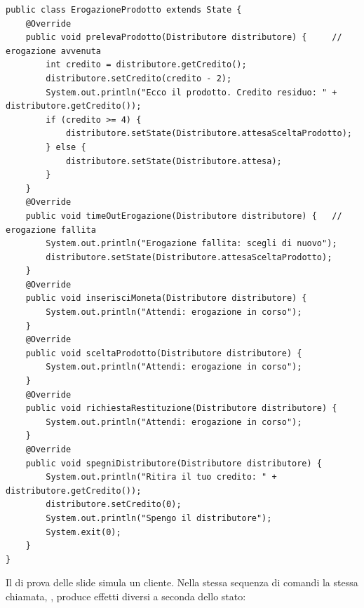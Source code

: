 \begin{lstlisting}[style=java, name=ErogazioneProdotto.java]
public class ErogazioneProdotto extends State {
    @Override
    public void prelevaProdotto(Distributore distributore) {     // erogazione avvenuta
        int credito = distributore.getCredito();
        distributore.setCredito(credito - 2);
        System.out.println("Ecco il prodotto. Credito residuo: " + distributore.getCredito());
        if (credito >= 4) {
            distributore.setState(Distributore.attesaSceltaProdotto);
        } else {
            distributore.setState(Distributore.attesa);
        }
    }
    @Override
    public void timeOutErogazione(Distributore distributore) {   // erogazione fallita
        System.out.println("Erogazione fallita: scegli di nuovo");
        distributore.setState(Distributore.attesaSceltaProdotto);
    }
    @Override
    public void inserisciMoneta(Distributore distributore) {
        System.out.println("Attendi: erogazione in corso");
    }
    @Override
    public void sceltaProdotto(Distributore distributore) {
        System.out.println("Attendi: erogazione in corso");
    }
    @Override
    public void richiestaRestituzione(Distributore distributore) {
        System.out.println("Attendi: erogazione in corso");
    }
    @Override
    public void spegniDistributore(Distributore distributore) {
        System.out.println("Ritira il tuo credito: " + distributore.getCredito());
        distributore.setCredito(0);
        System.out.println("Spengo il distributore");
        System.exit(0);
    }
}
\end{lstlisting}

Il  di prova delle slide simula un cliente. Nella stessa sequenza di comandi la stessa chiamata,
, produce effetti diversi a seconda dello stato:

